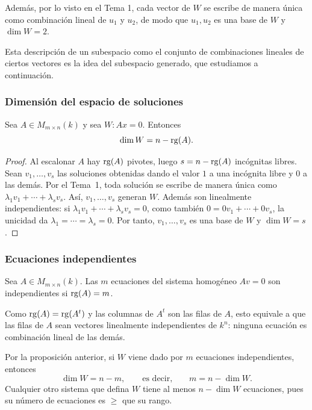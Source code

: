 \begin{frame}[allowframebreaks]
    \medskip

    Además, por lo visto en el Tema 1, cada vector de $W$ se escribe de
    manera \alert{única} como combinación lineal de $u_1$ y $u_2$, de modo
    que $u_1,u_2$ es una base de $W$ y $\dim W=2$.

    \medskip

    Esta descripción de un subespacio como el conjunto de combinaciones
    lineales de ciertos vectores es la idea del \alert{subespacio generado},
    que estudiamos a continuación.
\end{frame}


\begin{frame}
    \frametitle{Dimensión del espacio de soluciones}

    \begin{proposition}
        Sea $A\in M_{m\times n}(k)$ y sea $W\colon Ax=0$. Entonces
        \[
            \dim W=n-\operatorname{rg}(A).
        \]
    \end{proposition}

    \begin{proof}
        Al escalonar $A$ hay $\operatorname{rg}(A)$ pivotes, luego $s=n-\operatorname{rg}(A)$
        incógnitas libres. Sean $v_1,\ldots,v_s$ las soluciones obtenidas
        dando el valor $1$ a una incógnita libre y $0$ a las demás.
        Por el Tema~1, toda solución se escribe de manera \alert{única} como
        $\lambda_1v_1+\cdots+\lambda_sv_s$. Así, $v_1,\ldots,v_s$ generan $W$.
        Además son linealmente independientes: si
        $\lambda_1v_1+\cdots+\lambda_sv_s=0$, como también
        $0=0v_1+\cdots+0v_s$, la unicidad da $\lambda_1=\cdots=\lambda_s=0$.
        Por tanto, $v_1,\ldots,v_s$ es una base de $W$ y $\dim W=s$.
    \end{proof}
\end{frame}


\begin{frame}
    \frametitle{Ecuaciones independientes}

    \begin{definition}
        Sea $A\in M_{m\times n}(k)$. Las $m$ ecuaciones del sistema
        homogéneo $Av=0$ son \alert{independientes} si $\operatorname{rg}(A)=m$.
    \end{definition}

    \medskip

    Como $\operatorname{rg}(A)=\operatorname{rg}(A^t)$ y las columnas de $A^t$ son las filas de $A$,
    esto equivale a que las filas de $A$ sean vectores linealmente
    independientes de $k^n$: ninguna ecuación es combinación lineal
    de las demás.

    \medskip

    Por la proposición anterior, si $W$ viene dado por $m$ ecuaciones
    independientes, entonces
    \[
        \dim W=n-m,
        \qquad\text{es decir,}\qquad
        m=n-\dim W.
    \]
    Cualquier otro sistema que defina $W$ tiene al menos $n-\dim W$
    ecuaciones, pues su número de ecuaciones es $\geq$ que su rango.
\end{frame}


